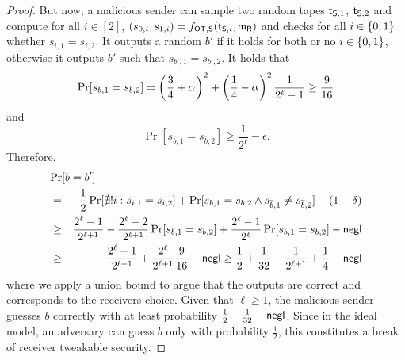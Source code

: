 \begin{proof}
But now, a malicious sender can sample two random tapes $\mathsf{t}_{\mathsf{S},1}$, $\mathsf{t}_{\mathsf{S},2}$
and compute for all $i\in[2]$, $(s_{0,i},s_{1,i})=f_{\mathsf{OT},\mathsf{S}}(\mathsf{t}_{\mathsf{S},i},\mathsf{m}_{\mathsf{R}})$ and checks for all $i\in\{0,1\}$ whether $s_{i,1}=s_{i,2}$. It outputs a random $b'$ if it holds for both or no $i\in\{0,1\}$, otherwise it outputs $b'$ such that $s_{b',1}=s_{b',2}$. It holds that
$$
\Pr[s_{b,1}=s_{b,2}]= \left(\frac{3}{4}+\alpha\right)^2+\left(\frac{1}{4}-\alpha\right)^2\frac{1}{2^\ell-1}\\
\geq \frac{9}{16}
$$
and
$$
\Pr[s_{\overline{b},1}=s_{\overline{b},2}]\geq \frac{1}{2^\ell}-\epsilon.
$$
Therefore,
\begin{eqnarray*}
\lefteqn{\Pr[b=b']}\\
&=&\frac{1}{2}\Pr[\nexists! i:s_{i,1}= s_{i,2}]+\Pr[s_{b,1}=s_{b,2}\wedge s_{\overline b,1}\neq s_{\overline b,2}]-(1-\delta)\\
&\geq& \frac{2^\ell-1}{2^{\ell+1}}-\frac{2^\ell-2}{2^{\ell+1}}\Pr[s_{b,1}=s_{b,2}]+\frac{2^\ell-1}{2^\ell}\Pr[s_{b,1}=s_{b,2}]
-\negl\\
&\geq & \frac{2^{\ell}-1}{2^{\ell+1}}+\frac{2^{\ell}}{2^{\ell+1}}\frac{9}{16}-\negl\geq
\frac{1}{2}+\frac{1}{32}-\frac{1}{2^{\ell+1}}+\frac{1}{4}-\negl
\end{eqnarray*}
where we apply a union bound to argue that the outputs are correct and corresponds to the receivers choice. Given that $\ell\geq 1$, the malicious sender guesses $b$ correctly with at least probability $\frac{1}{2}+\frac{1}{32}-\mathsf{negl}$. Since in the ideal model, an adversary can guess $b$ only with probability $\frac{1}{2}$, this constitutes a break of receiver tweakable security.


\end{proof}
